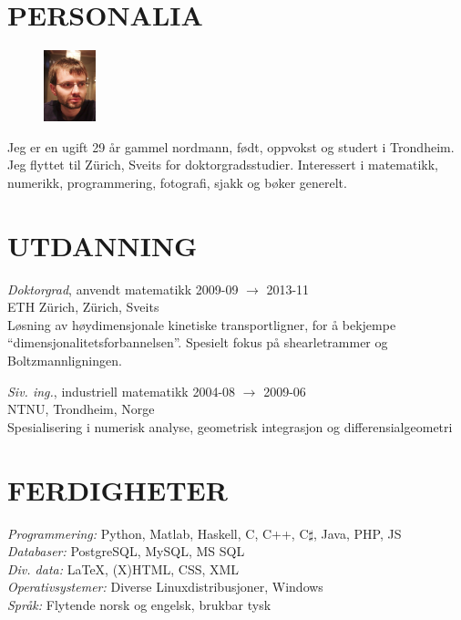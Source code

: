 \documentclass[line,margin]{res}
\newcommand{\zh}{Z\"{u}rich}
\begin{document}
\address{Forchstrasse 168, CH-8032 \zh}
\address{+41 78 634 68 37, evfonn@gmail.com}


\begin{resume}

\section{PERSONALIA}
    \begin{figure}
        \vspace{-0.6cm}
        \includegraphics[width=1.5cm]{photo.png}
    \end{figure}
    Jeg er en ugift 29 år gammel nordmann, født, oppvokst og studert i Trondheim. Jeg flyttet til \zh,
    Sveits for doktorgradsstudier. Interessert i matematikk, numerikk, programmering, fotografi, sjakk og
    bøker generelt.


\section{UTDANNING} 
    {\em Doktorgrad}, anvendt matematikk \hfill 2009-09 $\to$ 2013-11 \\
    ETH \zh, \zh, Sveits \\
    Løsning av høydimensjonale kinetiske transportligner, for å bekjempe
    ``dimensjonalitetsforbannelsen''. Spesielt fokus på shearlet\-rammer og
    Boltzmann\-ligningen.

    {\em Siv. ing.}, industriell matematikk \hfill 2004-08 $\to$ 2009-06 \\
    NTNU, Trondheim, Norge \\
    Spesialisering i numerisk analyse, geometrisk integrasjon og differensialgeometri


\section{FERDIGHETER}
    {\em Programmering:} Python, Matlab, Haskell, C, C++, C$\sharp$, Java, PHP, JS \\
    {\em Databaser:} PostgreSQL, MySQL, MS SQL \\
    {\em Div. data:} \LaTeX, (X)HTML, CSS, XML \\
    {\em Operativsystemer:} Diverse Linuxdistribusjoner, Windows \\
    {\em Språk:} Flytende norsk og engelsk, brukbar tysk



\end{resume}
\end{document}
